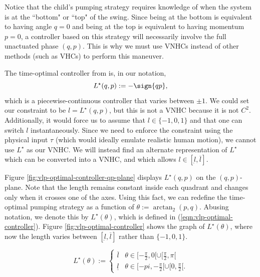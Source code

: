 Notice that the child's pumping strategy requires knowledge of
when the system is at the ``bottom" or ``top" of the swing. 
Since being at the bottom is equivalent to having angle \(q = 0\) and being
at the top is equivalent to having momentum \(p = 0\), a controller based on
this strategy will necessarily involve the full unactuated phase \((q,p)\). 
This is why we must use VNHCs instead of other methods (such as VHCs) 
to perform this maneuver.

The time-optimal controller from \cite{pumping_swing_standing_squatting} is, in
our notation,
\[
   L^\star(q,p) := -\sign{qp}
   ,
\]
which is a piecewise-continuous controller that varies between \(\pm 1\). 
We could set our constraint to be \(l = L^\star(q,p)\), but this is not a VNHC
because it is not \(C^2\).
Additionally, it would force us to assume that \(l \in \{-1,0,1\}\) and that one
can switch \(l\) instantaneously.
Since we need to enforce the constraint using the physical input \(\tau\) (which
would ideally emulate realistic human motion), we cannot use \(L^\star\) as our
VNHC.
We will instead find an alternate representation of \(L^\star\) which can be
converted into a VNHC, and which allows 
\(l \in [\underbar{l},\overbar{l}]\).

Figure \ref{fig:vlp-optimal-controller-qp-plane} displays \(L^\star(q,p)\) 
on the \((q,p)\)-plane.
Note that the length remains constant inside each quadrant and changes only when it
crosses one of the axes. Using this fact, we can redefine
the time-optimal pumping strategy as a function of 
\(\theta := \arctan_2(p,q)\).
Abusing notation, we denote this by \(L^\star(\theta)\), which is defined in
(\ref{eqn:vlp-optimal-controller}).
Figure \ref{fig:vlp-optimal-controller} shows the graph of \(L^\star(\theta)\), 
where now the length varies between \([\underbar{l},\overbar{l}]\) rather than 
\(\{-1,0,1\}\). 

\begin{equation}\label{eqn:vlp-optimal-controller}
   L^\star(\theta):= \begin{cases}
      \overline{l} & \theta \in [-\frac{\pi}{2},0[ \cup [\frac{\pi}{2}, \pi[ \\
      \underline{l} & \theta \in [-pi, -\frac{\pi}{2}[ \cup [0,\frac{\pi}{2}[ 
      .
   \end{cases}
\end{equation}


